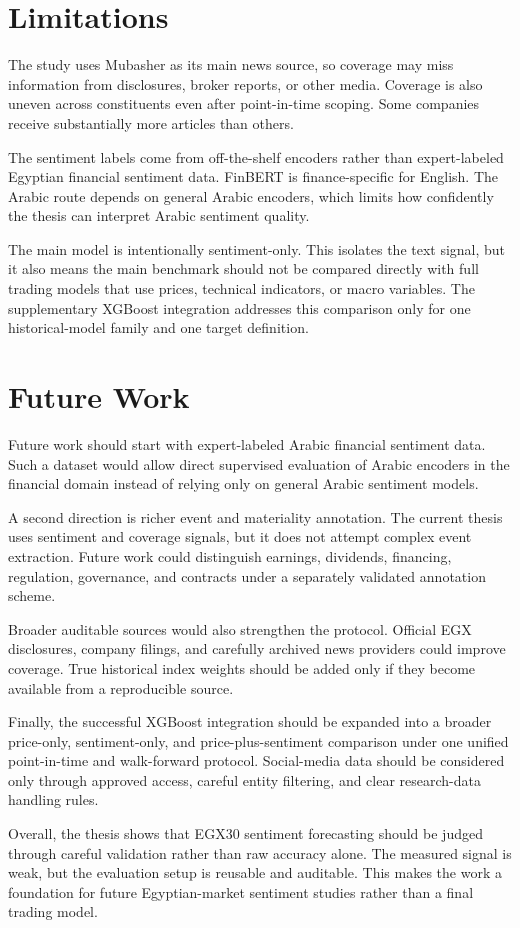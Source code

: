\section{Limitations}

The study uses Mubasher as its main news source, so coverage may miss information from disclosures, broker reports, or other media. Coverage is also uneven across constituents even after point-in-time scoping. Some companies receive substantially more articles than others.

The sentiment labels come from off-the-shelf encoders rather than expert-labeled Egyptian financial sentiment data. FinBERT is finance-specific for English. The Arabic route depends on general Arabic encoders, which limits how confidently the thesis can interpret Arabic sentiment quality.

The main model is intentionally sentiment-only. This isolates the text signal, but it also means the main benchmark should not be compared directly with full trading models that use prices, technical indicators, or macro variables. The supplementary XGBoost integration addresses this comparison only for one historical-model family and one target definition.

\section{Future Work}

Future work should start with expert-labeled Arabic financial sentiment data. Such a dataset would allow direct supervised evaluation of Arabic encoders in the financial domain instead of relying only on general Arabic sentiment models.

A second direction is richer event and materiality annotation. The current thesis uses sentiment and coverage signals, but it does not attempt complex event extraction. Future work could distinguish earnings, dividends, financing, regulation, governance, and contracts under a separately validated annotation scheme.

Broader auditable sources would also strengthen the protocol. Official EGX disclosures, company filings, and carefully archived news providers could improve coverage. True historical index weights should be added only if they become available from a reproducible source.

Finally, the successful XGBoost integration should be expanded into a broader price-only, sentiment-only, and price-plus-sentiment comparison under one unified point-in-time and walk-forward protocol. Social-media data should be considered only through approved access, careful entity filtering, and clear research-data handling rules.

Overall, the thesis shows that EGX30 sentiment forecasting should be judged through careful validation rather than raw accuracy alone. The measured signal is weak, but the evaluation setup is reusable and auditable. This makes the work a foundation for future Egyptian-market sentiment studies rather than a final trading model.
